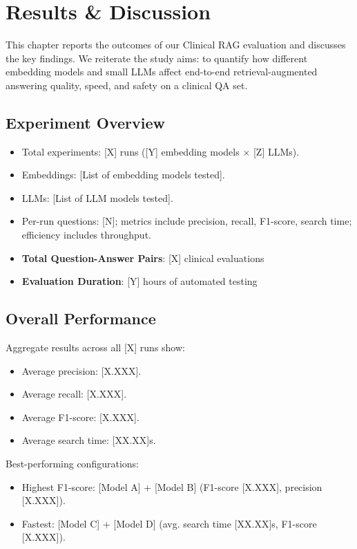 \chapter{Results \& Discussion}
\label{chap:results}

\noindent This chapter reports the outcomes of our Clinical RAG evaluation and discusses the key findings. We reiterate the study aims: to quantify how different embedding models and small LLMs affect end-to-end retrieval-augmented answering quality, speed, and safety on a clinical QA set.

\section{Experiment Overview}
\begin{itemize}
  \item Total experiments: [X] runs ([Y] embedding models \(\times\) [Z] LLMs).
  \item Embeddings: [List of embedding models tested].
  \item LLMs: [List of LLM models tested].
  \item Per-run questions: [N]; metrics include precision, recall, F1-score, search time; efficiency includes throughput.
  \item \textbf{Total Question-Answer Pairs}: [X] clinical evaluations
  \item \textbf{Evaluation Duration}: [Y] hours of automated testing
\end{itemize}

\section{Overall Performance}
Aggregate results across all [X] runs show:
\begin{itemize}
  \item Average precision: [X.XXX].
  \item Average recall: [X.XXX].
  \item Average F1-score: [X.XXX].
  \item Average search time: [XX.XX]s.
\end{itemize}

Best-performing configurations:
\begin{itemize}
  \item Highest F1-score: [Model A] + [Model B] (F1-score [X.XXX], precision [X.XXX]).
  \item Fastest: [Model C] + [Model D] (avg. search time [XX.XX]s, F1-score [X.XXX]).
\end{itemize}

